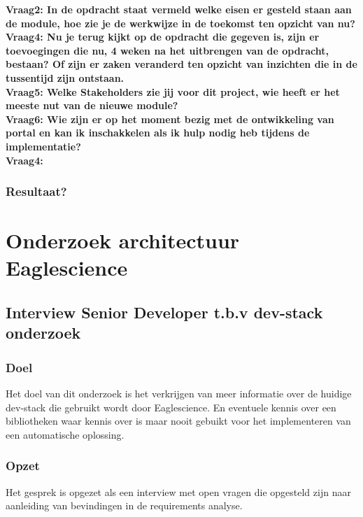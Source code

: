 \textbf{Vraag2: In de opdracht staat vermeld welke eisen er gesteld staan aan de module, hoe zie je de werkwijze in de toekomst ten opzicht van nu?}
\lipsum[03]\\

\textbf{Vraag4: Nu je terug kijkt op de opdracht die gegeven is, zijn er toevoegingen die nu, 4 weken na het uitbrengen van de opdracht, bestaan? Of zijn er zaken veranderd ten opzicht van inzichten die in de tussentijd zijn ontstaan.}
\lipsum[05]\\

\textbf{Vraag5: Welke Stakeholders zie jij voor dit project, wie heeft er het meeste nut van de nieuwe module? }
\lipsum[06]\\

\textbf{Vraag6: Wie zijn er op het moment bezig met de ontwikkeling van portal en kan ik inschakkelen als ik hulp nodig heb tijdens de implementatie?}
\lipsum[09]\\
\textbf{Vraag4: }
\lipsum[07]\\

\subsubsection{Resultaat?}

\section{Onderzoek architectuur Eaglescience}
\subsection{Interview Senior Developer t.b.v dev-stack onderzoek}
\subsubsection{Doel}
Het doel van dit onderzoek is het verkrijgen van meer informatie over de huidige dev-stack die gebruikt wordt door Eaglescience. En eventuele kennis over een bibliotheken waar kennis over is maar nooit gebuikt voor het implementeren van een automatische oplossing.
\subsubsection{Opzet}
Het gesprek is opgezet als een interview met open vragen die opgesteld zijn naar aanleiding van bevindingen in de requirements analyse.
